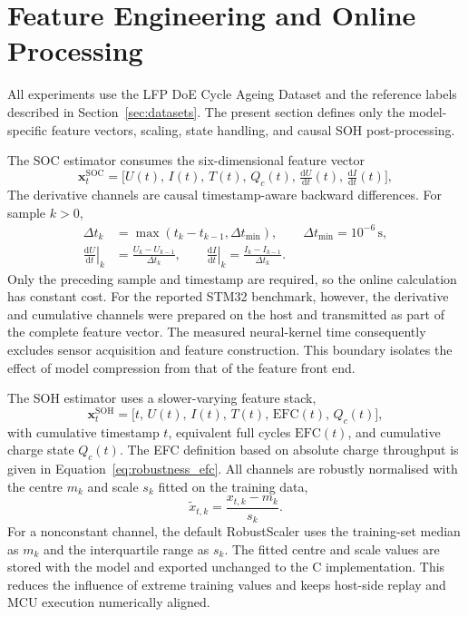 \documentclass[
    a4paper,
    12pt,
    titlepage,
    bibliography=totoc,
    twoside=on,
    parskip=false,
    numbers=noenddot,
    cleardoublepage=empty,
    DIV=12,
    BCOR=12.0mm,
    headheight=36pt,
    headings=openright
]{scrreprt}
\begin{document}
\section{Feature Engineering and Online Processing}
All experiments use the LFP DoE Cycle Ageing Dataset and the reference labels described in Section~\ref{sec:datasets}.\autocite{lfpDoeCycleAgingDataset2025,jgneJGCFR186501800mAh32VProductSpecification} The present section defines only the model-specific feature vectors, scaling, state handling, and causal SOH post-processing.

The SOC estimator consumes the six-dimensional feature vector
\begin{equation}
\mathbf{x}^{\mathrm{SOC}}_t=\bigl[U(t),\,I(t),\,T(t),\,Q_c(t),\,\tfrac{\mathrm{d}U}{\mathrm{d}t}(t),\,\tfrac{\mathrm{d}I}{\mathrm{d}t}(t)\bigr],
\end{equation}
The derivative channels are causal timestamp-aware backward differences. For sample $k>0$,
\begin{align}
    \Delta t_k &= \max(t_k-t_{k-1},\Delta t_{\min}),
    \qquad \Delta t_{\min}=10^{-6}\,\mathrm{s}, \label{eq:embedded_feature_dt}\\
    \left.\frac{\mathrm{d}U}{\mathrm{d}t}\right|_k
    &=\frac{U_k-U_{k-1}}{\Delta t_k}, \qquad
    \left.\frac{\mathrm{d}I}{\mathrm{d}t}\right|_k
    =\frac{I_k-I_{k-1}}{\Delta t_k}. \label{eq:embedded_backward_difference}
\end{align}
Only the preceding sample and timestamp are required, so the online calculation has constant cost. For the reported STM32 benchmark, however, the derivative and cumulative channels were prepared on the host and transmitted as part of the complete feature vector. The measured neural-kernel time consequently excludes sensor acquisition and feature construction. This boundary isolates the effect of model compression from that of the feature front end.

The SOH estimator uses a slower-varying feature stack,
\begin{equation}
\mathbf{x}^{\mathrm{SOH}}_t=\bigl[t,\,U(t),\,I(t),\,T(t),\,\mathrm{EFC}(t),\,Q_c(t)\bigr],
\end{equation}
with cumulative timestamp $t$, equivalent full cycles $\mathrm{EFC}(t)$, and cumulative charge state $Q_c(t)$. The EFC definition based on absolute charge throughput is given in Equation~\ref{eq:robustness_efc}. All channels are robustly normalised with the centre $m_k$ and scale $s_k$ fitted on the training data,
\begin{equation}
\tilde{x}_{t,k}=\frac{x_{t,k}-m_k}{s_k}.
\end{equation}
For a nonconstant channel, the default RobustScaler uses the training-set median as $m_k$ and the interquartile range as $s_k$. The fitted centre and scale values are stored with the model and exported unchanged to the C implementation. This reduces the influence of extreme training values and keeps host-side replay and MCU execution numerically aligned.\autocite{huberRobustStatistics2009,pedregosaScikitlearnMachineLearning2012}
\end{document}
